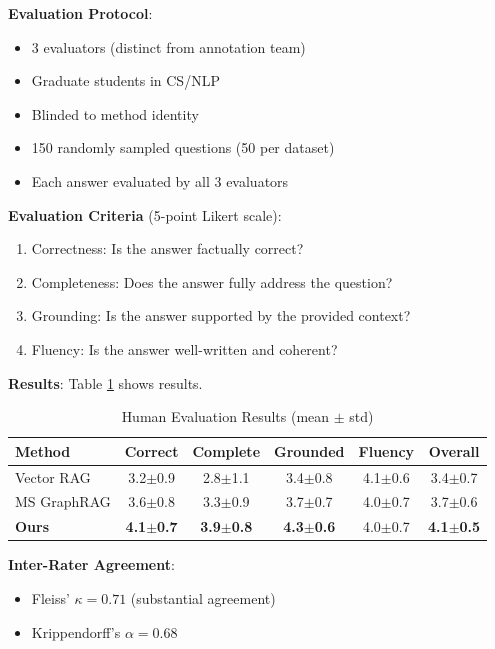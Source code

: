 \documentclass[conference]{IEEEtran}
\begin{document}
\textbf{Evaluation Protocol}:
\begin{itemize}
    \item 3 evaluators (distinct from annotation team)
    \item Graduate students in CS/NLP
    \item Blinded to method identity
    \item 150 randomly sampled questions (50 per dataset)
    \item Each answer evaluated by all 3 evaluators
\end{itemize}

\textbf{Evaluation Criteria} (5-point Likert scale):
\begin{enumerate}
    \item Correctness: Is the answer factually correct?
    \item Completeness: Does the answer fully address the question?
    \item Grounding: Is the answer supported by the provided context?
    \item Fluency: Is the answer well-written and coherent?
\end{enumerate}

\textbf{Results}: Table \ref{tab:human} shows results.

\begin{table}[htbp]
\caption{Human Evaluation Results (mean $\pm$ std)}
\label{tab:human}
\centering
\begin{tabular}{lccccc}
\toprule
\textbf{Method} & \textbf{Correct} & \textbf{Complete} & \textbf{Grounded} & \textbf{Fluency} & \textbf{Overall} \\
\midrule
Vector RAG & 3.2$\pm$0.9 & 2.8$\pm$1.1 & 3.4$\pm$0.8 & 4.1$\pm$0.6 & 3.4$\pm$0.7 \\
MS GraphRAG & 3.6$\pm$0.8 & 3.3$\pm$0.9 & 3.7$\pm$0.7 & 4.0$\pm$0.7 & 3.7$\pm$0.6 \\
\textbf{Ours} & \textbf{4.1$\pm$0.7} & \textbf{3.9$\pm$0.8} & \textbf{4.3$\pm$0.6} & 4.0$\pm$0.7 & \textbf{4.1$\pm$0.5} \\
\bottomrule
\end{tabular}
\end{table}

\textbf{Inter-Rater Agreement}:
\begin{itemize}
    \item Fleiss' $\kappa = 0.71$ (substantial agreement)
    \item Krippendorff's $\alpha = 0.68$
\end{itemize}
\end{document}
